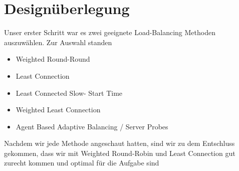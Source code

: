 \documentclass[11pt,a4paper]{article}
\begin{document}
\section{Designüberlegung}
Unser erster Schritt war es zwei geeignete Load-Balancing Methoden auszuwählen. Zur Auswahl standen
\begin{itemize}
	\item Weighted Round-Round
	\item Least Connection
	\item Least Connected Slow- Start Time
	\item Weighted Least Connection
	\item Agent Based Adaptive Balancing / Server Probes
\end{itemize}
Nachdem wir jede Methode angeschaut hatten, sind wir zu dem Entschluss gekommen, dass wir mit Weighted Round-Robin und 
Least Connection gut zurecht kommen und optimal für die Aufgabe sind


\end{document}
